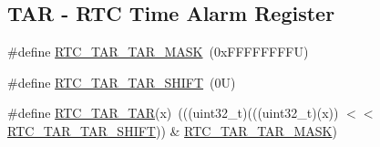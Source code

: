 \subsection*{T\+AR -\/ R\+TC Time Alarm Register}
\begin{DoxyCompactItemize}
\item 
\#define \mbox{\hyperlink{group___r_t_c___register___masks_ga649a76416ad00079054bd866565dada2}{R\+T\+C\+\_\+\+T\+A\+R\+\_\+\+T\+A\+R\+\_\+\+M\+A\+SK}}~(0x\+F\+F\+F\+F\+F\+F\+F\+F\+U)
\item 
\#define \mbox{\hyperlink{group___r_t_c___register___masks_ga9ec8791d91dc36f0f59a7705988f7278}{R\+T\+C\+\_\+\+T\+A\+R\+\_\+\+T\+A\+R\+\_\+\+S\+H\+I\+FT}}~(0\+U)
\item 
\#define \mbox{\hyperlink{group___r_t_c___register___masks_ga02ce5bc2603bebe1356ce961142f6700}{R\+T\+C\+\_\+\+T\+A\+R\+\_\+\+T\+AR}}(x)~(((uint32\+\_\+t)(((uint32\+\_\+t)(x)) $<$$<$ \mbox{\hyperlink{group___r_t_c___register___masks_ga9ec8791d91dc36f0f59a7705988f7278}{R\+T\+C\+\_\+\+T\+A\+R\+\_\+\+T\+A\+R\+\_\+\+S\+H\+I\+FT}})) \& \mbox{\hyperlink{group___r_t_c___register___masks_ga649a76416ad00079054bd866565dada2}{R\+T\+C\+\_\+\+T\+A\+R\+\_\+\+T\+A\+R\+\_\+\+M\+A\+SK}})
\end{DoxyCompactItemize}
